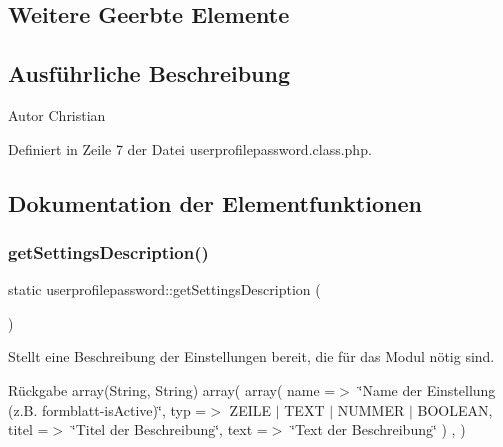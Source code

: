 \subsection*{Weitere Geerbte Elemente}


\subsection{Ausführliche Beschreibung}
\begin{DoxyAuthor}{Autor}
Christian 
\end{DoxyAuthor}


Definiert in Zeile 7 der Datei userprofilepassword.\+class.\+php.



\subsection{Dokumentation der Elementfunktionen}
\mbox{\label{classuserprofilepassword_adf648cadc203ef9ba955696b15052f6f}} 
\subsubsection{\texorpdfstring{get\+Settings\+Description()}{getSettingsDescription()}}
{\footnotesize\ttfamily static userprofilepassword\+::get\+Settings\+Description (\begin{DoxyParamCaption}{ }\end{DoxyParamCaption})\hspace{0.3cm}{\ttfamily [static]}}

Stellt eine Beschreibung der Einstellungen bereit, die für das Modul nötig sind. \begin{DoxyReturn}{Rückgabe}
array(\+String, String) array( array( \textquotesingle{}name\textquotesingle{} =$>$ \char`\"{}\+Name der Einstellung (z.\+B. formblatt-\/is\+Active)\char`\"{}, \textquotesingle{}typ\textquotesingle{} =$>$ Z\+E\+I\+LE $\vert$ T\+E\+XT $\vert$ N\+U\+M\+M\+ER $\vert$ B\+O\+O\+L\+E\+AN, \textquotesingle{}titel\textquotesingle{} =$>$ \char`\"{}\+Titel der Beschreibung\char`\"{}, \textquotesingle{}text\textquotesingle{} =$>$ \char`\"{}\+Text der Beschreibung\char`\"{} ) , ) 
\end{DoxyReturn}


